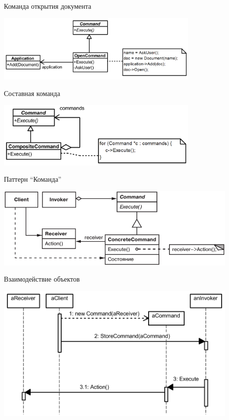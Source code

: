 \documentclass{../../slides-style}
\begin{document}
    \begin{frame}{Команда открытия документа}
        \begin{center}
            \includegraphics[width=0.75\textwidth]{openDocumentCommand.png}
        \end{center}
    \end{frame}

    \begin{frame}{Составная команда}
        \begin{center}
            \includegraphics[width=0.75\textwidth]{compositeCommand.png}
        \end{center}
    \end{frame}

    \begin{frame}{Паттерн \enquote{Команда}}
        \begin{center}
            \includegraphics[width=0.9\textwidth]{command.png}
        \end{center}
    \end{frame}

    \begin{frame}{Взаимодействие объектов}
        \begin{center}
            \includegraphics[width=0.9\textwidth]{commandSequence.png}
        \end{center}
    \end{frame}
\end{document}
